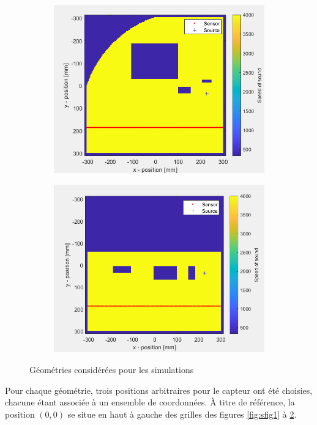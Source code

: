 \documentclass[conference]{IEEEtran}
\begin{document}
\begin{figure}[H]
\begin{subfigure}{.155\textwidth}
    \includegraphics[width=.95\linewidth]{forme5.png}
    \caption{}
    \label{fig:sfig5}
  \end{subfigure}
  \begin{subfigure}{.155\textwidth}
    \centering
    \includegraphics[width=.95\linewidth]{forme6.png}
    \caption{}
    \label{fig:sfig6}
  \end{subfigure}
  \caption{Géométries considérées pour les simulations}
  \label{fig:fig}
\end{figure}
Pour chaque géométrie, trois positions arbitraires pour le capteur ont été choisies,
chacune étant associée à un ensemble de coordonnées. À titre de référence, la position $(0,0)$ se situe 
en haut à gauche des grilles des figures \ref{fig:sfig1} à \ref{fig:sfig6}.  
\end{document}

